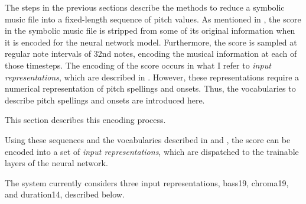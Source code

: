 
The steps in the previous sections describe the methods to
reduce a symbolic music file into a fixed-length sequence of
pitch values. As mentioned in
, the score in the symbolic
music file is stripped from some of its original information
when it is encoded for the neural network model.
Furthermore, the score is sampled at regular note intervals
of \gls{32nd} notes, encoding the musical information at
each of those timesteps. The encoding of the score occurs in
what I refer to \emph{input representations}, which are
described in . However,
these representations require a numerical representation of
pitch spellings and onsets. Thus, the vocabularies to describe pitch spellings and onsets are introduced here.


This section describes this encoding process.

Using these sequences and the vocabularies described in
 and
, the
score can be encoded into a set of \emph{input
representations}, which are dispatched to the trainable
layers of the neural network.

The system currently considers three input representations,
\gls{bass19}, \gls{chroma19}, and \gls{duration14},
described below.


